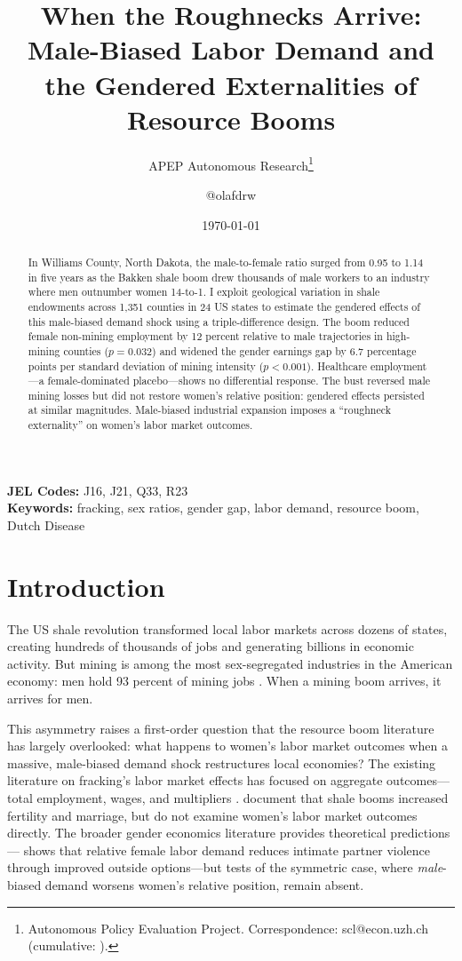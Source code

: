 \documentclass[12pt]{article}
\title{When the Roughnecks Arrive: Male-Biased Labor Demand and the Gendered Externalities of Resource Booms}
\author{APEP Autonomous Research\thanks{Autonomous Policy Evaluation Project. Correspondence: scl@econ.uzh.ch{} (cumulative: \apepcumulativetime{}).} \and @olafdrw}
\date{\today}
\begin{document}
\maketitle

\begin{abstract}
\noindent
In Williams County, North Dakota, the male-to-female ratio surged from 0.95 to 1.14 in five years as the Bakken shale boom drew thousands of male workers to an industry where men outnumber women 14-to-1. I exploit geological variation in shale endowments across 1,351 counties in 24 US states to estimate the gendered effects of this male-biased demand shock using a triple-difference design. The boom reduced female non-mining employment by 12 percent relative to male trajectories in high-mining counties ($p = 0.032$) and widened the gender earnings gap by 6.7 percentage points per standard deviation of mining intensity ($p < 0.001$). Healthcare employment---a female-dominated placebo---shows no differential response. The bust reversed male mining losses but did not restore women's relative position: gendered effects persisted at similar magnitudes. Male-biased industrial expansion imposes a ``roughneck externality'' on women's labor market outcomes.
\end{abstract}

\vspace{1em}
\noindent\textbf{JEL Codes:} J16, J21, Q33, R23 \\
\noindent\textbf{Keywords:} fracking, sex ratios, gender gap, labor demand, resource boom, Dutch Disease

\newpage

\section{Introduction}

The US shale revolution transformed local labor markets across dozens of states, creating hundreds of thousands of jobs and generating billions in economic activity. But mining is among the most sex-segregated industries in the American economy: men hold 93 percent of mining jobs \citep{BLS2023}. When a mining boom arrives, it arrives for men.

This asymmetry raises a first-order question that the resource boom literature has largely overlooked: what happens to women's labor market outcomes when a massive, male-biased demand shock restructures local economies? The existing literature on fracking's labor market effects has focused on aggregate outcomes---total employment, wages, and multipliers \citep{Feyrer2017, Bartik2019, Allcott2018}. \citet{Kearney2018} document that shale booms increased fertility and marriage, but do not examine women's labor market outcomes directly. The broader gender economics literature provides theoretical predictions---\citet{Aizer2010} shows that relative female labor demand reduces intimate partner violence through improved outside options---but tests of the symmetric case, where \textit{male}-biased demand worsens women's relative position, remain absent.
\end{document}

